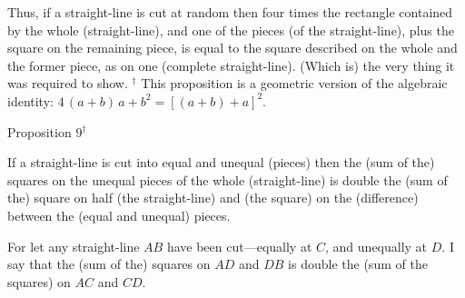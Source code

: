 Thus, if a straight-line is cut at random then four times the rectangle contained
by the whole (straight-line), and one of the pieces (of the straight-line), plus the square on the remaining piece,
is equal to  the square described on the whole and the former piece, as
on one (complete straight-line). (Which is) the very thing it was required to show.
{\footnotesize \noindent$^\dag$ This proposition is a geometric version
of the algebraic identity: $4\,(a+b)\,a+b^2 = [(a+b)+a]^2$.}


\begin{center}
{\large Proposition 9$^\dag$}
\end{center}

If a straight-line is cut into equal and unequal (pieces) then the (sum of
the) squares on the unequal pieces of the whole (straight-line) is double
the (sum of the) square on half (the straight-line) and (the square) on the (difference)
between the (equal and unequal) pieces.

\epsfysize=1.8in
\centerline{}

For let any straight-line $AB$ have been cut---equally at $C$, and unequally
at $D$. I say that the (sum of the) squares on $AD$ and $DB$ is double
the (sum of the squares) on $AC$ and $CD$.

